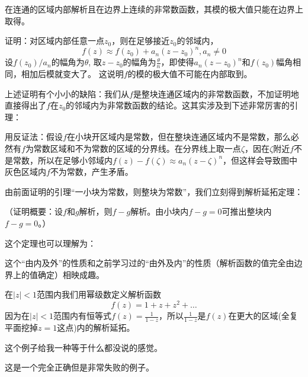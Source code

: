 \documentclass[CJK]{beamer}
\begin{document}
\begin{frame}
  \bch
      {\blue 在连通的区域内部解析且在边界上连续的非常数函数，其模的极大值只能在边界上取得。}


      证明：对区域内部任意一点$z_0$，则在足够接近$z_0$的邻域内，
     $$ f(z) \approx f(z_0)+a_n(z-z_0)^n,  a_n\ne 0$$
      设$f(z_0)/a_n$的幅角为$\theta$, 取$z-z_0$的幅角为$\frac{\theta}{n}$，即使得$a_n(z-z_0)^n$和$f(z_0)$幅角相同，相加后模就变大了。
      这说明$f$的模的极大值不可能在内部取到。

  \ech
\end{frame}


\begin{frame}
  \bch
   上述证明有个小小的缺陷：我们从$f$是整块连通区域内的非常数函数，不加证明地直接得出了$f$在$z_0$的邻域内为非常数函数的结论。这其实涉及到下述非常厉害的引理：


  用反证法：假设$f$在小块开区域内是常数，但在整块连通区域内不是常数，那么必然有$f$为常数区域和不为常数的区域的分界线。在分界线上取一点$\zeta$，因在$\zeta$附近$f$不是常数，所以在足够小邻域内$f(z)-f(\zeta) \approx a_n(z-\zeta)^n$，但这样会导致图中灰色区域内$f$不为常数，产生矛盾。
  \emini
  \emini

  \ech
\end{frame}


\begin{frame}
  \bch
  由前面证明的引理“一小块为常数，则整块为常数”，我们立刻得到解析延拓定理：
  
  （证明概要：设$f$和$g$解析，则$f-g$解析。由小块内$f-g=0$可推出整块内$f-g=0$。）

  \skiplines

  这个定理也可以理解为：
  
  这个“由内及外”的性质和之前学习过的“由外及内”的性质（解析函数的值完全由边界上的值确定）相映成趣。
  \ech
\end{frame}

\begin{frame}
  \bch
  在$|z|<1$范围内我们用幂级数定义解析函数
  $$f(z) = 1+z+z^2+\ldots$$
  因为在$|z|<1$范围内有恒等式$f(z) = \frac{1}{1-z}$，所以$\frac{1}{1-z}$是$f(z)$在更大的区域(全复平面挖掉$z=1$这点)内的解析延拓。


  \skiplines


  \skipline
  
  \wulian 这个例子给我一种等于什么都没说的感觉。
  
  \bye 这是一个完全正确但是非常失败的例子。

  \ech
\end{frame}
\end{document}
